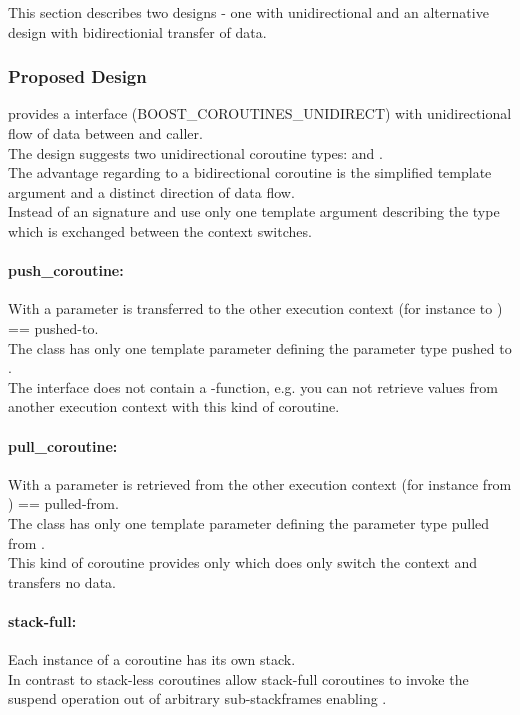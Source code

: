 This section describes two designs - one with unidirectional and an alternative
design with bidirectionial transfer of data.

\subsubsection*{Proposed Design}
\boostcoroutine provides a interface (BOOST\_COROUTINES\_UNIDIRECT) with
unidirectional flow of data between \corofunction and caller.\\
The design suggests two unidirectional coroutine types: \pushcoro and
\pullcoro.\\
The advantage regarding to a bidirectional coroutine is the simplified template
argument and a distinct direction of data flow.\\
Instead of an signature \pullcoro and \pushcoro use only one template argument
describing the type which is exchanged between the context switches.

\paragraph*{push\_coroutine:}
With \pushcoro a parameter is transferred to the other execution context (for
instance to \corofunction) == pushed-to.\\
The class has only one template parameter defining the parameter type pushed to
\corofunction.\\
\newline
The interface does not contain a -function, e.g. you can not retrieve
values from another execution context with this kind of coroutine.

\paragraph*{pull\_coroutine:}
With \pullcoro a parameter is retrieved from the other execution context (for
instance from \corofunction) == pulled-from.\\
The class has only one template parameter defining the parameter type pulled
from \corofunction.\\
\newline
This kind of coroutine provides only \pullcoroop which does only switch the
context and transfers no data.

\paragraph*{stack-full:}
Each instance of a coroutine has its own stack.\\
\newline
In contrast to stack-less coroutines allow stack-full coroutines to invoke the
suspend operation out of arbitrary sub-stackframes enabling \escreops.

